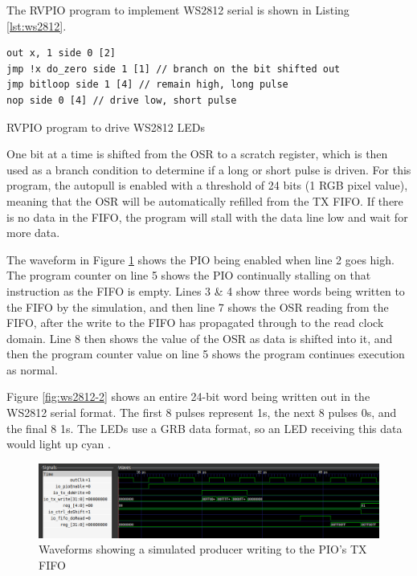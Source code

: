 The RVPIO program to implement WS2812 serial is shown in Listing \ref{lst:ws2812}.

\begin{listing}[h!]
    \begin{verbatim}
out x, 1 side 0 [2] 
jmp !x do_zero side 1 [1] // branch on the bit shifted out
jmp bitloop side 1 [4] // remain high, long pulse
nop side 0 [4] // drive low, short pulse
    \end{verbatim}
    \caption{RVPIO program to drive WS2812 LEDs}
    \label{lst:ws2812}
\end{listing}

One bit at a time is shifted from the OSR to a scratch register, which is then used as a branch condition to determine if a long or short pulse is driven. For this program, the autopull is enabled with a threshold of 24 bits (1 RGB pixel value), meaning that the OSR will be automatically refilled from the TX FIFO. If there is no data in the FIFO, the program will stall with the data line low and wait for more data.

The waveform in Figure \ref{fig:ws2812-1} shows the PIO being enabled when line 2 goes high. The program counter on line 5 shows the PIO continually stalling on that instruction as the FIFO is empty. Lines 3 \& 4 show three words being written to the FIFO by the simulation, and then line 7 shows the OSR reading from the FIFO, after the write to the FIFO has propagated through to the read clock domain. Line 8 then shows the value of the OSR as data is shifted into it, and then the program counter value on line 5 shows the program continues execution as normal.

Figure \ref{fig:ws2812-2} shows an entire 24-bit word being written out in the WS2812 serial format. The first 8 pulses represent 1s, the next 8 pulses 0s, and the final 8 1s. The LEDs use a GRB data format, so an LED receiving this data would light up cyan \cite{ws2812}.

\begin{figure}[H]
    \centering
    \includegraphics[width=\textwidth]{../img/ws2812-1.png}
    \caption{Waveforms showing a simulated producer writing to the PIO's TX FIFO}
    \label{fig:ws2812-1}
\end{figure}

